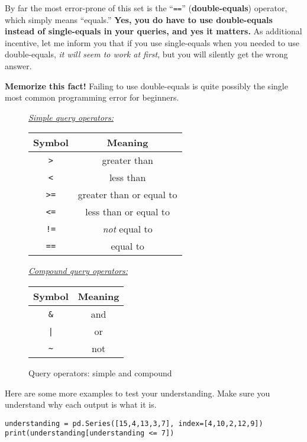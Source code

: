 
By far the most error-prone of this set is the ``\texttt{==}''
(\textbf{double-equals}) operator, which simply means ``equals.'' \textbf{Yes,
you do have to use double-equals instead of single-equals in your queries, and
yes it matters.} As additional incentive, let me inform you that if you use
single-equals when you needed to use double-equals, \textit{it will seem to
work at first}, but you will silently get the wrong answer.

\textbf{Memorize this fact!} Failing to use double-equals is quite possibly the
single most common programming error for beginners.

\begin{figure}[ht]
\centering
\small
\bigskip
\underline{\textit{Simple query operators:}}\\
\smallskip
\begin{tabular}{c|c}
Symbol & Meaning \\
\hline
\texttt{>} & greater than \\
\hline
\texttt{<} & less than \\
\hline
\texttt{>=} & greater than or equal to \\
\hline
\texttt{<=} & less than or equal to \\
\hline
\texttt{!=} & \textit{not} equal to \\
\hline
\texttt{==} & equal to \\
\end{tabular}

\bigskip
\bigskip
\underline{\textit{Compound query operators:}}\\
\smallskip
\begin{tabular}{c|c}
Symbol & Meaning \\
\hline
\texttt{\&} & and \\
\hline
\texttt{|} & or \\
\hline
\texttt{\textasciitilde} & not \\
\end{tabular}

\bigskip
\normalsize
\caption{Query operators: simple and compound}
\label{fig:queryOps}
\end{figure}


Here are some more examples to test your understanding. Make sure you
understand why each output is what it is.

\begin{Verbatim}[fontsize=\footnotesize,samepage=true,frame=single,framesep=3mm]
understanding = pd.Series([15,4,13,3,7], index=[4,10,2,12,9])
print(understanding[understanding <= 7])
\end{Verbatim}
\vspace{-.3in}

